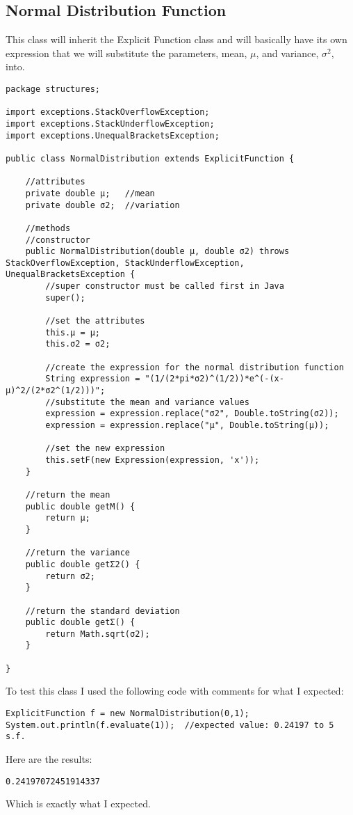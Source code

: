 \documentclass[../../../../main.tex]{subfiles}
\begin{document}
\subsection{Normal Distribution Function}
This class will inherit the Explicit Function class and will basically have its own expression that we will substitute the parameters, mean, $\mu$, and variance, $\sigma^2$, into.
\begin{verbatim}
package structures;

import exceptions.StackOverflowException;
import exceptions.StackUnderflowException;
import exceptions.UnequalBracketsException;

public class NormalDistribution extends ExplicitFunction {
	
	//attributes
	private double μ;	//mean
	private double σ2;	//variation
	
	//methods
	//constructor
	public NormalDistribution(double μ, double σ2) throws StackOverflowException, StackUnderflowException, UnequalBracketsException {
		//super constructor must be called first in Java
		super();
		
		//set the attributes
		this.μ = μ;	
		this.σ2 = σ2;
		
		//create the expression for the normal distribution function
		String expression = "(1/(2*pi*σ2)^(1/2))*e^(-(x-μ)^2/(2*σ2^(1/2)))";
		//substitute the mean and variance values
		expression = expression.replace("σ2", Double.toString(σ2));
		expression = expression.replace("μ", Double.toString(μ));
		
		//set the new expression
		this.setF(new Expression(expression, 'x'));
	}
	
	//return the mean
	public double getΜ() {
		return μ;
	}
	
	//return the variance
	public double getΣ2() {
		return σ2;
	}
	
	//return the standard deviation
	public double getΣ() {
		return Math.sqrt(σ2);
	}

}
\end{verbatim}
To test this class I used the following code with comments for what I expected:
\begin{verbatim}
ExplicitFunction f = new NormalDistribution(0,1);
System.out.println(f.evaluate(1));	//expected value: 0.24197 to 5 s.f.
\end{verbatim}
Here are the results:
\begin{verbatim}
0.24197072451914337
\end{verbatim}
Which is exactly what I expected.
\newpage
\end{document}
